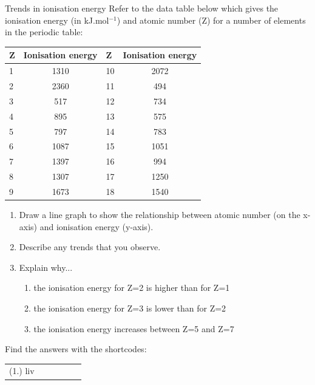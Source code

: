 \begin{exercises}{Trends in ionisation energy}
Refer to the data table below which gives the ionisation energy (in kJ.mol$^{-1}$) and atomic number (Z) for a number of elements in the periodic table:\\

\begin{center}
\begin{tabular}{|l|c|l|c|}\hline
\textbf{Z} & Ionisation energy & \textbf{Z} & Ionisation energy \\\hline
1 & 1310 & 10 & 2072 \\\hline
2 & 2360 & 11 & 494 \\\hline
3 & 517 & 12 & 734 \\\hline
4 & 895 & 13 & 575 \\\hline
5 & 797 & 14 & 783 \\\hline
6 & 1087 & 15 & 1051 \\\hline
7 & 1397 & 16 & 994 \\\hline
8 & 1307 & 17 & 1250 \\\hline
9 & 1673 & 18 & 1540 \\\hline
\end{tabular}
\end{center}

\begin{enumerate}[noitemsep, label=\textbf{\arabic*}. ]
\item{Draw a line graph to show the relationship between atomic number (on the x-axis) and ionisation energy (y-axis).}
\item{Describe any trends that you observe.}
\item{Explain why...
	\begin{enumerate}[noitemsep, label=\textbf{\arabic*}. ]
	\item{the ionisation energy for Z=2 is higher than for Z=1}
	\item{the ionisation energy for Z=3 is lower than for Z=2}
	\item{the ionisation energy increases between Z=5 and Z=7}
	\end{enumerate}
}
\end{enumerate}
      \label{m38757*secfhsst!!!underscore!!!id936}
\par {} Find the answers with the shortcodes:
 \par \begin{tabular}[h]{cccccc}
 (1.) liv  & \end{tabular}
\end{exercises}
